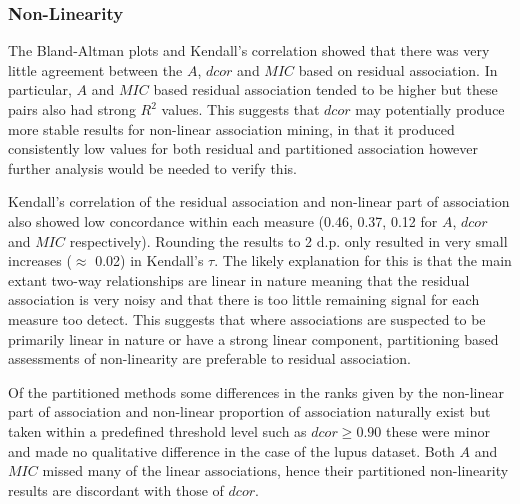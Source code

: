 \documentclass[a4paper, 12pt]{report}
\begin{document}

\subsubsection{Non-Linearity}
The Bland-Altman plots and Kendall's correlation showed that there was very little agreement between the $A$, $dcor$ and $MIC$ based on residual association. In particular, $A$ and $MIC$ based residual association tended to be higher but these pairs also had strong $R^2$ values. This suggests that $dcor$ may potentially produce more stable results for non-linear association mining, in that it produced consistently low values for both residual and partitioned association however further analysis would be needed to verify this.

Kendall's correlation of the residual association and non-linear part of association also showed low concordance within each measure (0.46, 0.37, 0.12 for $A$, $dcor$ and $MIC$ respectively). Rounding the results to 2 d.p. only resulted in very small increases ($\approx$ 0.02) in Kendall's $\tau$. The likely explanation for this is that the main extant two-way relationships are linear in nature meaning that the residual association is very noisy and that there is too little remaining signal for each measure too detect.  This suggests that where associations are suspected to be primarily linear in nature or have a strong linear component, partitioning based assessments of non-linearity are preferable to residual association.

Of the partitioned methods some differences in the ranks given by the non-linear part of association and non-linear proportion of association naturally exist but taken within a predefined threshold level such as $dcor \ge 0.90$ these were minor and made no qualitative difference in the case of the lupus dataset. Both $A$ and $MIC$ missed many of the linear associations, hence their partitioned non-linearity results are discordant with those of $dcor$.

\end{document}
